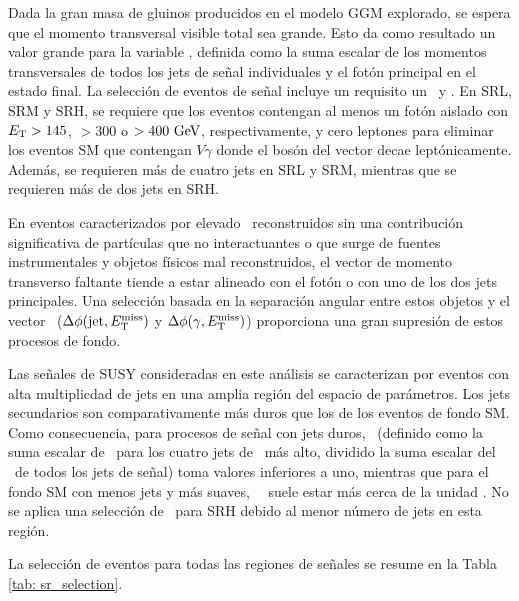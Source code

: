 Dada la gran masa de gluinos producidos en el modelo GGM explorado, se espera que el momento transversal visible total sea grande. Esto da como resultado un valor grande para la variable \HT, definida como la suma escalar de los momentos transversales de todos los jets de señal individuales y el fotón principal en el estado final.
La selección de eventos de señal incluye un requisito un \HT \ y \met.
En SRL, SRM y SRH, se requiere que los eventos contengan al menos un fotón aislado con $E_{\text{T}}> 145$, $>300 $ o $>400\ \text{GeV}$, respectivamente, y cero leptones para eliminar los eventos SM que contengan $ V\gamma$ donde el bosón del vector decae leptónicamente. Además, se requieren más de cuatro jets en SRL y SRM, mientras que se requieren más de dos jets en SRH.

En eventos caracterizados por elevado \met\ reconstruidos sin una contribución significativa de partículas que no interactuantes o que surge de fuentes instrumentales y objetos físicos mal reconstruidos, el vector de momento transverso faltante tiende a
estar alineado con el fotón o con uno de los dos jets principales. Una selección basada en la separación angular entre estos objetos y el vector \met\ ($\Delta\phi(\text{jet}, E_{\text{T}}^{\text{miss}})$ y $\Delta\phi(\gamma, E_{\text{T}}^{\text{miss}})$) proporciona una gran supresión de estos procesos de fondo.

Las señales de SUSY consideradas en este análisis se caracterizan por
eventos con alta multiplicdad de jets en una amplia región del espacio de parámetros. Los jets secundarios son comparativamente más duros que los de los eventos de fondo SM. Como consecuencia, para procesos de señal con jets duros, \rtf\ (definido como la suma escalar de \pt\ para los cuatro jets de \pt\ más alto, dividido la suma escalar del \pt\ de todos los jets de señal) toma valores inferiores a uno, mientras que para el fondo SM con menos jets y más suaves, \ \rtf\ suele estar más cerca de la unidad \cite{SUSY-2016-27}.
No se aplica una selección de \rtf\ para SRH debido al menor número de jets en esta región.

La selección de eventos para todas las regiones de señales se resume en la Tabla \ref{tab: sr_selection}. 

